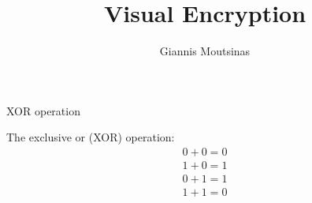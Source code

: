 \documentclass{beamer}
\title[Visual Encryption]{Visual Encryption}
\author{Giannis Moutsinas}
\date{}
\begin{document}
\begin{frame}
  \titlepage
  \vfill

{\tiny
\doclicenseThis
}
\end{frame}


\begin{frame}{XOR operation}

The exclusive or (XOR) operation:
\begin{align*}
0+0=0\\
1+0=1\\
0+1=1\\
1+1=0
\end{align*}

\end{frame}
\end{document}
